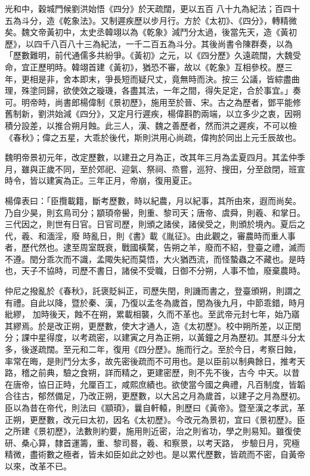 \begin{pinyinscope}
 光和中，穀城門候劉洪始悟《四分》於天疏闊，更以五百
 八十九為紀法；百四十五為斗分，造《乾象法》。又制遲疾歷以步月行。方於《太初》、《四分》，轉精微矣。魏文帝黃初中，太史丞韓翊以為《乾象》減鬥分太過，後當先天，造《黃初歷》，以四千八百八十三為紀法，一千二百五為斗分。其後尚書令陳群奏，以為「歷數難明，前代通儒多共紛爭。《黃初》之元，以《四分歷》久遠疏闊，大魏受命，宜正歷明時。韓翊首建《黃初》，猶恐不審，故以《乾象》互相參校。歷三年，更相是非，舍本即末，爭長短而疑尺丈，竟無時而決。按三
 公議，皆綜盡曲理，殊塗同歸，欲使效之璇璣，各盡其法，一年之間，得失足定，合於事宜。」奏可。明帝時，尚書郎楊偉制《景初歷》，施用至於晉、宋。古之為歷者，鄧平能修舊制新，劉洪始減《四分》，又定月行遲疾，楊偉斟酌兩端，以立多少之衷，因朔積分設差，以推合朔月蝕。此三人，漢、魏之善歷者，然而洪之遲疾，不可以檢《春秋》；偉之五星，大乖於後代，斯則洪用心尚疏，偉拘於同出上元壬辰故也。



 魏明帝景初元年，改定歷數，以建丑之月為正，改其年三月為孟夏四月。其孟仲季月，雖與正歲不同，至於郊祀、迎氣、祭祠、烝嘗，巡狩、搜田，分至啟閉，班宣時令，皆以建寅為正。三年正月，帝崩，復用夏正。



 楊偉表曰：「臣攬載籍，斷考歷數，時以紀農，月以紀事，其所由來，遐而尚矣。乃自少昊，則玄鳥司分；顓頊帝嚳，則重、黎司天；唐帝、虞舜，則羲、和掌日。三代因之，則世有日官。日官司歷，則頒之諸侯，諸侯受之，則頒於境內。夏后之代，羲、和湎淫，廢
 時亂日，則《書》載《胤征》。由此觀之，審農時而重人事者，歷代然也。逮至周室既衰，戰國橫騖，告朔之羊，廢而不紹，登臺之禮，滅而不遵。閏分乖次而不識，孟陬失紀而莫悟，大火猶西流，而怪蟄蟲之不藏也。是時也，天子不協時，司歷不書日，諸侯不受職，日御不分朔，人事不恤，廢棄農時。



 仲尼之撥亂於《春秋》，託褒貶糾正，司歷失閏，則譏而書之，登臺頒朔，則謂之有禮。自此以降，暨於秦、漢，乃復以孟冬為歲首，閏為後九月，中節乖錯，時月紕繆，
 加時後天，蝕不在朔，累載相襲，久而不革也。至武帝元封七年，始乃寤其繆焉。於是改正朔，更歷數，使大才通人，造《太初歷》。校中朔所差，以正閏分；課中星得度，以考疏密，以建寅之月為正朔，以黃鐘之月為歷初。其歷斗分太多，後遂疏闊。至元和二年，復用《四分歷》。施而行之。至於今日，考察日蝕，率常在晦，是則鬥分太多，故先密後疏而不可用也。是以臣前以制典餘日，推考天路，稽之前典，驗之食朔，詳而精之，更建密歷，則不先不後，古今
 中天。以昔在唐帝，協日正時，允厘百工，咸熙庶績也。欲使當今國之典禮，凡百制度，皆韜合往古，郁然備足，乃改正朔，更歷數，以大呂之月為歲首，以建子之月為歷初。臣以為昔在帝代，則法曰《顓頊》，曩自軒轅，則歷曰《黃帝》。暨至漢之孝武，革正朔，更歷數，改元曰太初，因名《太初歷》。今改元為景初，宜曰《景初歷》。臣之所建《景初歷》，法數則約要，施用則近密，治之則省功，學之則易知。雖復使研、桑心算，隸首運籌，重、黎司晷，羲、和察景，以考天路，
 步驗日月，究極精微，盡術數之極者，皆未如臣如此之妙也。是以累代歷數，皆疏而不密，自黃帝以來，改革不已。




\end{pinyinscope}
